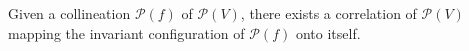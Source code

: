 Given a collineation $\mathcal{P}(f)$ of $\mathcal{P}(V)$, there exists a correlation of $\mathcal{P}(V)$ mapping the invariant configuration of $\mathcal{P}(f)$ onto itself.
